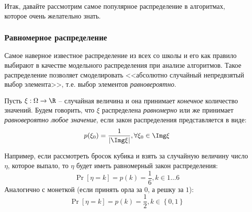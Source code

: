 Итак, давайте рассмотрим самое популярное распределение в алгоритмах, которое очень желательно знать.

\subsubsection{Равномерное распределение}

Самое наверное известное распределение из всех со школы и его как правило выбирают в качестве модельного распределения при анализе алгоритмов. Такое распределение позволяет смоделировать <<абсолютно случайный непредвзятый выбор элемента>>, т.е. выбор элементов \textit{равновероятно}.

\Def Пусть $\xi: \Omega \to \R$ -- случайная величина и она принимает \textit{конечное} количество значений. Будем говорить, что $\xi$ распределена \textit{равномерно} или же принимает \textit{равновероятно любое значение}, если закон распределения представляется в виде:
\begin{equation*}
    p(\xi_0) = \frac{1}{|\Img \xi|}, \forall \xi_0 \in \Img \xi
\end{equation*}

Например, если рассмотреть бросок кубика и взять за случайную величину число $\eta$, которое выпало, то $\eta$ будет иметь равномерный закон распределения:
\begin{equation*}
    \Pr[\eta = k] = p(k) = \frac{1}{6}, k \in 1 \dots 6
\end{equation*}
Аналогично с монеткой (если принять орла за $0$, а решку за $1$):
\begin{equation*}
    \Pr[\eta = k] = p(k) = \frac{1}{2}, k \in \left\{ 0, 1 \right\}
\end{equation*}

